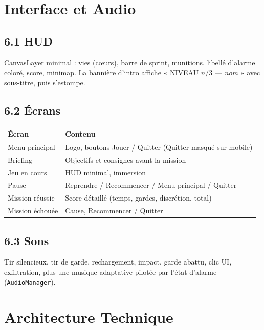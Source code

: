 \documentclass[11pt,a4paper]{article}
\newcommand{\code}[1]{\colorbox{codebg}{\texttt{#1}}}
\begin{document}
\section{Interface et Audio}

\subsection{6.1 HUD}
CanvasLayer minimal : vies (c\oe urs), barre de sprint, munitions, libell\'e
d'alarme color\'e, score, minimap. La banni\`ere d'intro affiche
« NIVEAU $n$/3 --- \emph{nom} » avec sous-titre, puis s'estompe.

\subsection{6.2 \'Ecrans}
\begin{center}
\begin{tabular}{ll}
\toprule
\textbf{\'Ecran} & \textbf{Contenu} \\
\midrule
Menu principal & Logo, boutons Jouer / Quitter (Quitter masqu\'e sur mobile) \\
Briefing & Objectifs et consignes avant la mission \\
Jeu en cours & HUD minimal, immersion \\
Pause & Reprendre / Recommencer / Menu principal / Quitter \\
Mission r\'eussie & Score d\'etaill\'e (temps, gardes, discr\'etion, total) \\
Mission \'echou\'ee & Cause, Recommencer / Quitter \\
\bottomrule
\end{tabular}
\end{center}

\subsection{6.3 Sons}
Tir silencieux, tir de garde, rechargement, impact, garde abattu, clic UI,
exfiltration, plus une musique adaptative pilot\'ee par l'\'etat d'alarme
(\code{AudioManager}).

\section{Architecture Technique}
\end{document}
